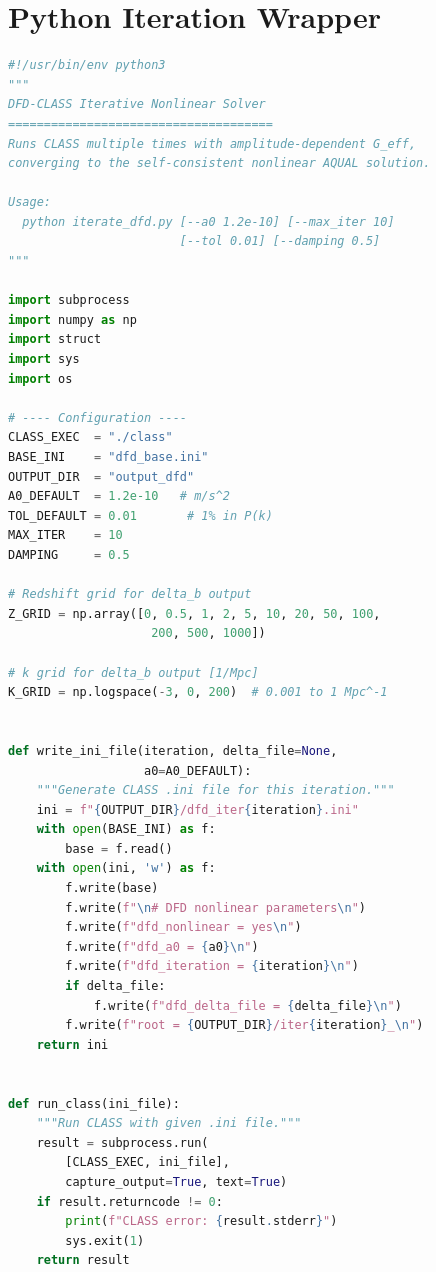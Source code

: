\documentclass[11pt]{article}
\theoremstyle{definition}
\theoremstyle{remark}
\begin{document}
\section{Python Iteration Wrapper}
\label{sec:python}

\begin{lstlisting}[language=Python,
  caption={iterate\_dfd.py --- Complete iteration wrapper},
  label={lst:python}]
#!/usr/bin/env python3
"""
DFD-CLASS Iterative Nonlinear Solver
=====================================
Runs CLASS multiple times with amplitude-dependent G_eff,
converging to the self-consistent nonlinear AQUAL solution.

Usage:
  python iterate_dfd.py [--a0 1.2e-10] [--max_iter 10]
                        [--tol 0.01] [--damping 0.5]
"""

import subprocess
import numpy as np
import struct
import sys
import os

# ---- Configuration ----
CLASS_EXEC  = "./class"
BASE_INI    = "dfd_base.ini"
OUTPUT_DIR  = "output_dfd"
A0_DEFAULT  = 1.2e-10   # m/s^2
TOL_DEFAULT = 0.01       # 1% in P(k)
MAX_ITER    = 10
DAMPING     = 0.5

# Redshift grid for delta_b output
Z_GRID = np.array([0, 0.5, 1, 2, 5, 10, 20, 50, 100,
                    200, 500, 1000])

# k grid for delta_b output [1/Mpc]
K_GRID = np.logspace(-3, 0, 200)  # 0.001 to 1 Mpc^-1


def write_ini_file(iteration, delta_file=None,
                   a0=A0_DEFAULT):
    """Generate CLASS .ini file for this iteration."""
    ini = f"{OUTPUT_DIR}/dfd_iter{iteration}.ini"
    with open(BASE_INI) as f:
        base = f.read()
    with open(ini, 'w') as f:
        f.write(base)
        f.write(f"\n# DFD nonlinear parameters\n")
        f.write(f"dfd_nonlinear = yes\n")
        f.write(f"dfd_a0 = {a0}\n")
        f.write(f"dfd_iteration = {iteration}\n")
        if delta_file:
            f.write(f"dfd_delta_file = {delta_file}\n")
        f.write(f"root = {OUTPUT_DIR}/iter{iteration}_\n")
    return ini


def run_class(ini_file):
    """Run CLASS with given .ini file."""
    result = subprocess.run(
        [CLASS_EXEC, ini_file],
        capture_output=True, text=True)
    if result.returncode != 0:
        print(f"CLASS error: {result.stderr}")
        sys.exit(1)
    return result



\end{lstlisting}
\end{document}
